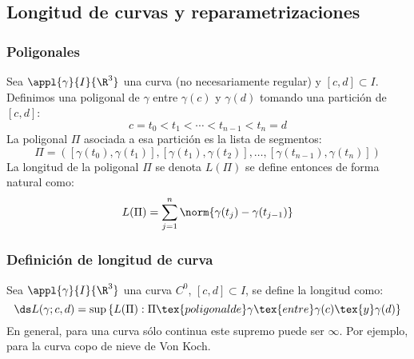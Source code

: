 \subsection{Longitud de curvas y reparametrizaciones}
\subsubsection{Poligonales}
Sea $\appl{\gamma}{I}{\R^3}$ una curva (no necesariamente regular) y $\left[c, d\right] \subset I$. Definimos una poligonal de $\gamma$ entre $\gamma(c)$ y $\gamma(d)$ tomando una partición de $\left[c, d\right]$:
\[c=t_0<t_1<\cdots<t_{n-1}<t_n=d\]
La poligonal $\Pi$ asociada a esa partición es la lista de segmentos:
\[\Pi=\left(\left[\gamma(t_0), \gamma(t_1)\right], \left[\gamma(t_1), \gamma(t_2)\right], \dots, \left[\gamma(t_{n-1}), \gamma(t_n)\right]\right)\]
La longitud de la poligonal $\Pi$ se denota $L(\Pi)$ se define entonces de forma natural como:
\[L(\Pi)=\sum_{j=1}^n \norm{\gamma(t_j)-\gamma(t_{j-1})}\]

\subsubsection{Definición de longitud de curva}
\begin{defn}
	Sea $\appl{\gamma}{I}{\R^3}$ una curva $C^0$, $\left[c,d\right] \subset  I$, se define la longitud como: \[\ds L(\gamma; c, d)=\sup \left\{L(\Pi) : \Pi\tex{ poligonal de } \gamma \tex{ entre }\gamma(c)\tex{ y }\gamma(d)\right\}\]
	En general, para una curva sólo continua este supremo puede ser $\infty$. Por ejemplo, para la curva copo de nieve de Von Koch.
\end{defn}

